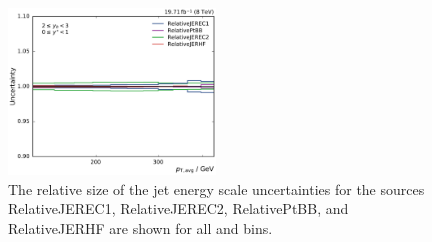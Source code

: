 \begin{figure}[htbp]
    \includegraphics[width=0.49\textwidth]{figures/measurement/jec_relunc_2_yb2ys0.pdf}
    \caption[Split-up of JEC sources: Part III] {The relative size of the jet energy scale
             uncertainties for the sources RelativeJEREC1, RelativeJEREC2,
             RelativePtBB, and RelativeJERHF are shown for all \ystar and \yboost bins.}
    \label{fig:jec_relunc_2}
\end{figure}


